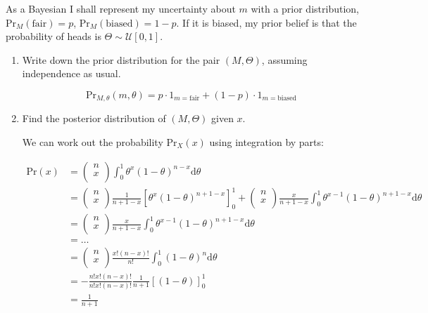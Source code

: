 \documentclass[10pt,\jkfside,a4paper]{article}
\begin{document}
\begin{enumerate}
As a Bayesian I shall represent my uncertainty about $m$ with a prior
distribution, $\text{Pr}_M(\text{fair}) = p$, $\text{Pr}_M(\text{biased}) =
1 - p$. If it is biased, my prior belief is that the probability of heads is
$\Theta \sim \mathcal{U}[0, 1]$.

\begin{enumerate}[label=(\alph*)]

\item Write down the prior distribution for the pair $(M, \Theta)$, assuming
independence as usual.

\[
\text{Pr}_{M, \theta}(m, \theta) = p
\cdot 1_{m=\text{fair}} + (1 - p) \cdot 1_{m=\text{biased}}
\]

\item Find the posterior distribution of $(M, \Theta)$ given $x$.

We can work out the probability $\text{Pr}_X(x)$ using integration by parts:

\[
\begin{split}
\text{Pr}(x)
&= \begin{pmatrix}
n \\ x \\
\end{pmatrix}
\int^1_0 \theta^x(1 - \theta)^{n-x} \text{d}\theta \\
&= \begin{pmatrix}
n \\ x \\
\end{pmatrix} \frac{1}{n + 1 - x}\left[ \theta^x(1 - \theta)^{n + 1 - x}
\right]^1_0 + \begin{pmatrix}
n \\ x \\
\end{pmatrix}\frac{x}{n + 1 - x}\int^{1}_{0} \theta^{x - 1}(1 - \theta)^{n +
1 - x} \text{d}\theta \\
&=  \begin{pmatrix}
n \\ x \\
\end{pmatrix}\frac{x}{n + 1 - x}\int^{1}_{0} \theta^{x - 1}(1 - \theta)^{n +
1 - x} \text{d}\theta \\
&= \dots \\
&= \begin{pmatrix}
n \\ x \\
\end{pmatrix}
\frac{x!(n - x)!}{n!}\int^{1}_{0} (1 - \theta)^n \text{d}\theta \\
&= -\frac{n!x!(n-x)!}{n!x!(n-x)!}\frac{1}{n + 1}\left[ (1 - \theta)
\right]^1_0 \\
&= \frac{1}{n + 1} \\
\end{split}
\]


\end{enumerate}
\end{enumerate}
\end{document}

